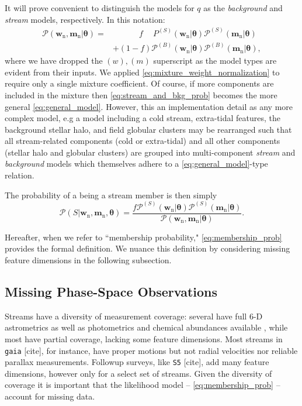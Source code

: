 \documentclass[twocolumn]{aastex631}
\newcommand{\dataarchive}[1]{\texttt{#1}}
\newcommand{\gaia}{\dataarchive{gaia}}
\newcommand{\mrm}[1]{\mathrm{#1}}
\newcommand{\mbs}[1]{\boldsymbol{#1}}
\newcommand{\mcal}[1]{\mathcal{#1}}
\newcommand{\pdf}{\mcal{P}}
\newcommand{\nth}[1]{{#1}_{\mrm{n}}}  %
\newcommand{\smallcomponent}[2]{#2^{\scriptscriptstyle (#1)}}
\newcommand{\cmp}[2]{\smallcomponent{#1}{#2}}
\newcommand{\Scmp}[1]{\cmp{S}{#1}}
\newcommand{\Bcmp}[1]{\cmp{B}{#1}}
\newcommand{\Spdf}{\Scmp{\pdf}}
\newcommand{\Bpdf}{\Bcmp{\pdf}}
\begin{document}
        It will prove convenient to distinguish the models for $q$ as the
        \textit{background} and \textit{stream} models, respectively. In this
        notation:
        \begin{align} \label{eq:stream_and_bkg_prob}
            \pdf(\nth{\mbs{w}}, \nth{\mbs{m}} | \mbs{\theta})
            =& \phantom{+} \qquad f \phantom{+} \Scmp{P}(\nth{\mbs{w}}|\mbs{\theta}) \Spdf(\nth{\mbs{m}}|\mbs{\theta}) \\
            & + (1-f) \Bpdf(\nth{\mbs{w}}|\mbs{\theta}) \Bpdf(\nth{\mbs{m}}|\mbs{\theta}), \nonumber
        \end{align}
        where we have dropped the $(w), (m)$ superscript as the model types are evident from their inputs. We applied \autoref{eq:mixture_weight_normalization} to require only a single mixture coefficient.
        Of course, if more components are included in the mixture then \autoref{eq:stream_and_bkg_prob} becomes the more general \autoref{eq:general_model}. However, this an implementation detail as any more complex model, e.g a model including a cold stream, extra-tidal features, the background stellar halo, and field globular clusters may be rearranged such that all stream-related components (cold or extra-tidal) and all other components (stellar halo and globular clusters) are grouped into multi-component \textit{stream} and \textit{background} models which themselves adhere to a \autoref{eq:general_model}-type relation.

        The probability of a being a stream member is then simply
        \begin{equation}\label{eq:membership_prob}
            \pdf\left(S | \nth{\mbs{w}}, \nth{\mbs{m}}, \mbs{\theta} \right) = \frac{f \Spdf(\nth{\mbs{w}}|\mbs{\theta}) \Spdf(\nth{\mbs{m}}|\mbs{\theta}) }{ \pdf(\nth{\mbs{w}}, \nth{\mbs{m}} | \mbs{\theta})}.
        \end{equation}

        Hereafter, when we refer to ``membership probability,"
        \autoref{eq:membership_prob} provides the formal definition. We nuance this definition by considering missing feature dimensions in the following subsection.

    \subsection{Missing Phase-Space Observations} \label{sub:missing_data}

        Streams have a diversity of measurement coverage: several have full 6-D astrometrics as well as photometrics and chemical abundances available \citep[e.g.,][]{Koposov2019, 2020A&A...635L...3A, 2022ApJ...928...30L}, while most have partial coverage, lacking some feature dimensions.
        Most streams in \gaia {\color{red} [cite]}, for instance, have proper motions but not radial velocities nor reliable parallax measurements. Followup surveys, like \dataarchive{S5} {\color{red} [cite]}, add many feature dimensions, however only for a select set of streams. Given the diversity of coverage it is important that the likelihood model -- \autoref{eq:membership_prob} -- account for missing data.
\end{document}
